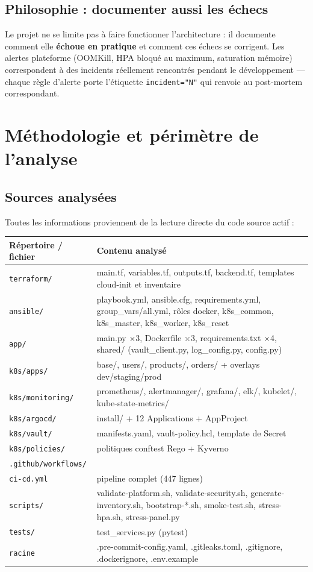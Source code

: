 \documentclass[12pt,a4paper]{article}
\begin{document}
\subsection{Philosophie : documenter aussi les échecs}
Le projet ne se limite pas à faire fonctionner l'architecture : il documente comment elle \textbf{échoue en pratique} et comment ces échecs se corrigent. Les alertes plateforme (OOMKill, HPA bloqué au maximum, saturation mémoire) correspondent à des incidents réellement rencontrés pendant le développement --- chaque règle d'alerte porte l'étiquette \texttt{incident="N"} qui renvoie au post-mortem correspondant.

\section{Méthodologie et périmètre de l'analyse}

\subsection{Sources analysées}
Toutes les informations proviennent de la lecture directe du code source actif :

\begin{longtable}{@{}p{4.6cm}p{9.6cm}@{}}
\toprule
\textbf{Répertoire / fichier} & \textbf{Contenu analysé} \\
\midrule
\endhead
\texttt{terraform/} & main.tf, variables.tf, outputs.tf, backend.tf, templates cloud-init et inventaire \\
\texttt{ansible/} & playbook.yml, ansible.cfg, requirements.yml, group\_vars/all.yml, rôles docker, k8s\_common, k8s\_master, k8s\_worker, k8s\_reset \\
\texttt{app/} & main.py ×3, Dockerfile ×3, requirements.txt ×4, shared/ (vault\_client.py, log\_config.py, config.py) \\
\texttt{k8s/apps/} & base/, users/, products/, orders/ + overlays dev/staging/prod \\
\texttt{k8s/monitoring/} & prometheus/, alertmanager/, grafana/, elk/, kubelet/, kube-state-metrics/ \\
\texttt{k8s/argocd/} & install/ + 12 Applications + AppProject \\
\texttt{k8s/vault/} & manifests.yaml, vault-policy.hcl, template de Secret \\
\texttt{k8s/policies/} & politiques conftest Rego + Kyverno \\
\texttt{.github/workflows/}\\ \texttt{ci-cd.yml} & pipeline complet (447 lignes) \\
\texttt{scripts/} & validate-platform.sh, validate-security.sh, generate-inventory.sh, bootstrap-*.sh, smoke-test.sh, stress-hpa.sh, stress-panel.py \\
\texttt{tests/} & test\_services.py (pytest) \\
\texttt{racine} & .pre-commit-config.yaml, .gitleaks.toml, .gitignore, .dockerignore, .env.example \\
\bottomrule
\end{longtable}
\end{document}

